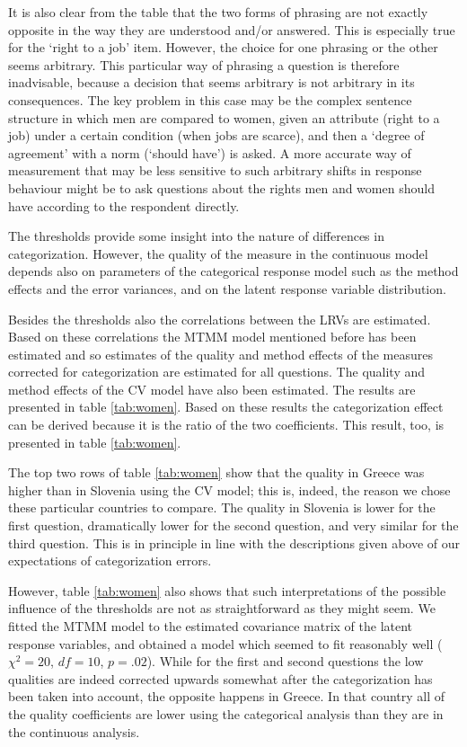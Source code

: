 \documentclass[a4paper,12pt]{article}
\begin{document}
It is also clear from the table that the two forms of phrasing are not exactly opposite in the way they are understood and/or answered. This is especially true for the `right to a job' item. However, the choice for one phrasing or the other seems arbitrary. This particular way of phrasing a question is therefore inadvisable, because a decision  that seems arbitrary is not arbitrary in its consequences. The key problem in this case may be the complex sentence structure in which men are compared to women, given an attribute (right to a job) under a certain condition (when jobs are scarce), and then a `degree of agreement' with a norm (`should have') is asked. A more accurate way of measurement that may be less sensitive to such arbitrary shifts in response behaviour might be to ask questions about the rights men and women should have according to the respondent directly.

The thresholds provide some insight into the nature of differences in categorization. However, the quality of the measure in the continuous model depends also on parameters of the categorical response model such as the method effects and the error variances, and on the latent response variable distribution. 


Besides the thresholds also the correlations between the LRVs are estimated. Based on these correlations the MTMM model mentioned before has been estimated and so estimates of the quality and method effects of the measures corrected for categorization are estimated for all questions. The quality and method effects of the CV model have also been estimated. The results are presented in table \ref{tab:women}. Based on these results the categorization effect can be derived because it is the ratio of the two coefficients. This result, too, is presented in table \ref{tab:women}.

The top two rows of table \ref{tab:women} show that the quality in Greece was higher than in Slovenia using the CV model; this is, indeed, the reason we chose these particular countries to compare. The quality in Slovenia is lower for the first question, dramatically lower for the second question, and very similar for the third question. This is in principle in line with the descriptions given above of our expectations of categorization errors.

However, table \ref{tab:women} also shows that such interpretations of the possible influence of the thresholds are not as straightforward as they might seem. We fitted the MTMM model to the estimated covariance matrix of the latent response variables, and obtained a model which seemed to fit reasonably well ($\chi^2 = 20$, $df=10$, $p=.02$). While for the first and second questions the low qualities are indeed corrected upwards somewhat after the categorization has been taken into account, the opposite happens in Greece. In that country all of the quality coefficients are lower using the categorical analysis than they are in the continuous analysis.  
\end{document}
